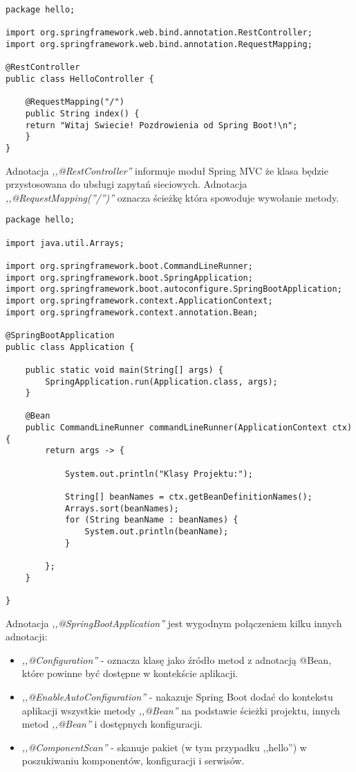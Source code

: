 \documentclass[a4paper,12pt,twoside,openany]{report}
\begin{document}
\begin{lstlisting}[label={MVCController}]
package hello;

import org.springframework.web.bind.annotation.RestController;
import org.springframework.web.bind.annotation.RequestMapping;

@RestController
public class HelloController {

	@RequestMapping("/")
	public String index() {
	return "Witaj Swiecie! Pozdrowienia od Spring Boot!\n";
	}
}
\end{lstlisting}
Adnotacja \textit{,,@RestController''} informuje moduł Spring MVC że klasa będzie przystosowana do ubsługi zapytań sieciowych. Adnotacja \textit{,,@RequestMapping(''/'')''} oznacza ścieżkę która spowoduje wywołanie metody.

\begin{lstlisting}
package hello;

import java.util.Arrays;

import org.springframework.boot.CommandLineRunner;
import org.springframework.boot.SpringApplication;
import org.springframework.boot.autoconfigure.SpringBootApplication;
import org.springframework.context.ApplicationContext;
import org.springframework.context.annotation.Bean;

@SpringBootApplication
public class Application {

	public static void main(String[] args) {
		SpringApplication.run(Application.class, args);
	}

	@Bean
	public CommandLineRunner commandLineRunner(ApplicationContext ctx) {
		return args -> {

			System.out.println("Klasy Projektu:");

			String[] beanNames = ctx.getBeanDefinitionNames();
			Arrays.sort(beanNames);
			for (String beanName : beanNames) {
				System.out.println(beanName);
			}

		};
	}

}
\end{lstlisting}
Adnotacja \textit{,,@SpringBootApplication''} jest wygodnym połączeniem kilku innych adnotacji: 
\begin{itemize}
	\item \textit{,,@Configuration''} - oznacza klasę jako źródło metod z adnotacją @Bean, które powinne być dostępne w kontekście aplikacji.
	\item \textit{,,@EnableAutoConfiguration''} - nakazuje Spring Boot dodać do kontekstu aplikacji wszystkie metody \textit{,,@Bean''} na podstawie ścieżki projektu, innych metod \textit{,,@Bean''} i dostępnych konfiguracji.
	\item \textit{,,@ComponentScan''} - skanuje pakiet (w tym przypadku ,,hello'') w poszukiwaniu komponentów, konfiguracji i serwisów.
\end{itemize}
\end{document}

